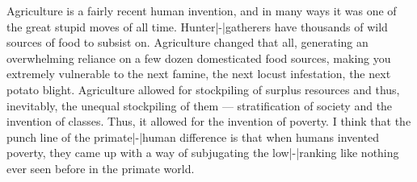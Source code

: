 Agriculture is a fairly recent human invention, and in many ways it was one of
the great stupid moves of all time. Hunter|-|gatherers have thousands of wild
sources of food to subsist on. Agriculture changed that all, generating an
overwhelming reliance on a few dozen domesticated food sources, making you
extremely vulnerable to the next famine, the next locust infestation, the next
potato blight. Agriculture allowed for stockpiling of surplus resources and thus,
inevitably, the unequal stockpiling of them --- stratification of society and
the invention of classes. Thus, it allowed for the invention of poverty. I think
that the punch line of the primate|-|human difference is that when humans
invented poverty, they came up with a way of subjugating the low|-|ranking like
nothing ever seen before in the primate world.
